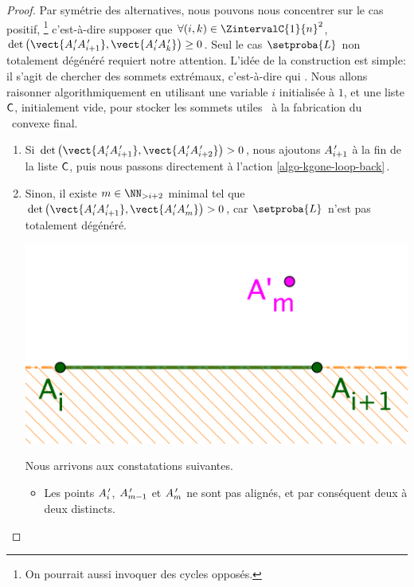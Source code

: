 \begin{proof}
    Par symétrie des alternatives, nous pouvons nous concentrer sur le cas positif,%
    \footnote{
        On pourrait aussi invoquer des cycles opposés.
    }
    c'est-à-dire supposer que 
    $\forall (i, k) \in \ZintervalC{1}{n}^2$,
	$\det \big( \vect{\primeit{A}_i \primeit{A}_{i+1}}, \vect{\primeit{A}_i \primeit{A}_k} \big) \geq 0$.
	Seul le cas $\setproba{L}$ non totalement dégénéré requiert notre attention.
	L'idée de la construction est simple: il s'agit de chercher des sommets extrémaux, c'est-à-dire qui . Nous allons raisonner algorithmiquement en utilisant
	une variable $i$ initialisée à $1$, 
	et
	une liste $\mathsf{C}$, initialement vide, pour stocker les sommets \og utiles \fg\ à la fabrication du \kgone\ convexe final.
	\begin{enumerate}[label=\fbox{\small\bfseries\textsf{A\kern.25pt\arabic*}}]
    	\item \label{algo-kgone-start}
	    Si 
		$\det \big( \vect{\primeit{A}_i \primeit{A}_{i+1}}, \vect{\primeit{A}_i \primeit{A}_{i+2}} \big) > 0$,
		nous ajoutons $A^{\,\prime}_{i+1}$ à la fin de la liste $\mathsf{C}$,
		puis nous passons directement à l'action \ref{algo-kgone-loop-back}\,.


    	\item \label{algo-kgone-remove-vertices}
        Sinon, il existe 
	    $m \in \NN_{>i+2}$ minimal tel que
		$\det \big( \vect{\primeit{A}_i \primeit{A}_{i+1}}, \vect{\primeit{A}_i \primeit{A}_m} \big) > 0$, car $\setproba{L}$ n'est pas totalement dégénéré.
        \begin{center}
        	\includegraphics[scale=.4]{content/polygon/at-least-one/algo-kgone-remove-vertices.png}
        \end{center}
        
        \noindent
        Nous arrivons aux constatations suivantes.
        \begin{itemize}
            \item Les points $A^{\,\prime}_i$, $A^{\,\prime}_{m-1}$ et $A^{\,\prime}_m$ ne sont pas alignés, et par conséquent deux à deux distincts.
            

\end{itemize}
\end{enumerate}
\end{proof}
